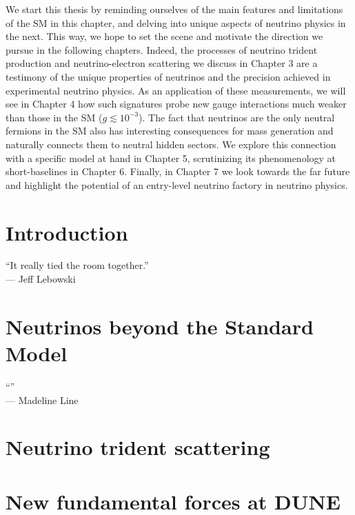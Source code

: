 \documentclass[openany,twoside,frontopenright,chaprunninghead]{ip3thesis}
\begin{document}
We start this thesis by reminding ourselves of the main features and limitations of the SM in this chapter, and delving into unique aspects of neutrino physics in the next. This way, we hope to set the scene and motivate the direction we pursue in the following chapters. Indeed, the processes of neutrino trident production and neutrino-electron scattering we discuss in Chapter 3 are a testimony of the unique properties of neutrinos and the precision achieved in experimental neutrino physics. As an application of these measurements, we will see in Chapter 4 how such signatures probe new gauge interactions much weaker than those in the SM ($g \lesssim 10^{-3}$). The fact that neutrinos are the only neutral fermions in the SM also has interesting consequences for mass generation and naturally connects them to neutral hidden sectors. We explore this connection with a specific model at hand in Chapter 5, scrutinizing its phenomenology at short-baselines in Chapter 6. Finally, in Chapter 7 we look towards the far future and highlight the potential of an entry-level neutrino factory in neutrino physics.

\chapter{Introduction}
\begin{flushright}
	``It really tied the room together.''
	\\--- Jeff Lebowski
\end{flushright}


\chapter{Neutrinos beyond the Standard Model}
\begin{flushright}
	``''
	\\--- Madeline Line
\end{flushright}


\chapter{Neutrino trident scattering}


\chapter{New fundamental forces at DUNE}

\end{document}
